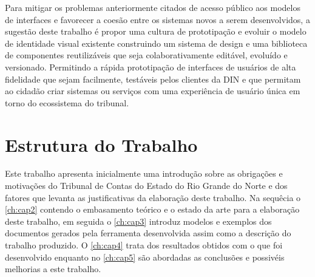 Para mitigar os problemas anteriormente citados de acesso público aos modelos de interfaces e favorecer a coesão entre os sistemas novos a serem desenvolvidos, a sugestão deste trabalho é propor uma cultura de prototipação  e evoluir o modelo de identidade visual existente construindo um sistema de design e uma biblioteca de componentes reutilizáveis que seja colaborativamente editável, evoluído e versionado. Permitindo a rápida prototipação de interfaces de usuários de alta fidelidade que sejam facilmente, testáveis pelos clientes da DIN e que permitam ao cidadão criar sistemas ou serviços com uma experiência de usuário única em torno do ecossistema do tribunal.


\section{Estrutura do Trabalho}
Este trabalho apresenta inicialmente uma introdução sobre as obrigações e motivações do Tribunal de Contas do Estado do Rio Grande do Norte e dos fatores que levanta as justificativas da elaboração deste trabalho.
Na sequêcia o \autoref{ch:cap2} contendo o embasamento teórico e o estado da arte para a elaboração deste trabalho, em seguida o \autoref{ch:cap3} introduz modelos e exemplos dos documentos gerados pela ferramenta desenvolvida assim como a descrição do trabalho produzido. O \autoref{ch:cap4} trata dos resultados obtidos com o que foi desenvolvido enquanto no \autoref{ch:cap5} são abordadas as conclusões e possivéis melhorias a este trabalho.
